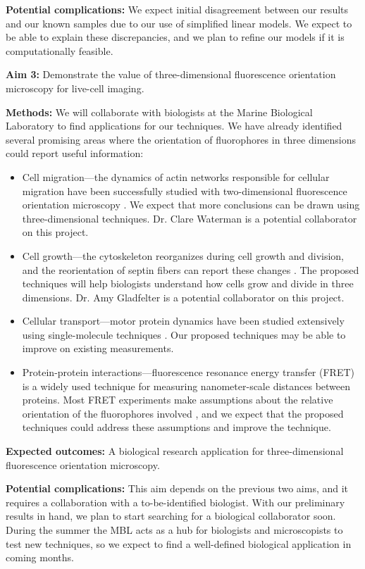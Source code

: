 \documentclass[11pt]{article}
\begin{document}
\noindent\textbf{Potential complications:} We expect initial disagreement
between our results and our known samples due to our use of simplified linear
models. We expect to be able to explain these discrepancies, and we plan to
refine our models if it is computationally feasible.

\noindent\textbf{Aim 3:} Demonstrate the value of three-dimensional fluorescence
  orientation microscopy for live-cell imaging.

\noindent\textbf{Methods:} We will collaborate with biologists at the Marine
Biological Laboratory to find applications for our techniques. We have already
identified several promising areas where the orientation of fluorophores in
three dimensions could report useful information:
\begin{itemize}
\item Cell migration---the dynamics of actin networks responsible for cellular
  migration have been successfully studied with two-dimensional fluorescence
  orientation microscopy \cite{swam}. We expect that more conclusions can be
  drawn using three-dimensional techniques. Dr. Clare Waterman is a potential
  collaborator on this project.
\item Cell growth---the cytoskeleton reorganizes during cell growth and
  division, and the reorientation of septin fibers can report these changes
  \cite{mehta2016}. The proposed techniques will help biologists understand how
  cells grow and divide in three dimensions. Dr. Amy Gladfelter is a potential
  collaborator on this project.
\item Cellular transport---motor protein dynamics have been studied extensively
  using single-molecule techniques \cite{toprak2006}. Our proposed techniques
  may be able to improve on existing measurements.
\item Protein-protein interactions---fluorescence resonance energy transfer
  (FRET) is a widely used technique for measuring nanometer-scale distances
  between proteins. Most FRET experiments make assumptions about the relative
  orientation of the fluorophores involved \cite{nov2006}, and we expect that the
  proposed techniques could address these assumptions and improve the technique.
\end{itemize}

\noindent\textbf{Expected outcomes:} A biological research application for
three-dimensional fluorescence orientation microscopy. 

\noindent\textbf{Potential complications:} This aim depends on the previous two
aims, and it requires a collaboration with a to-be-identified biologist. With
our preliminary results in hand, we plan to start searching for a biological
collaborator soon. During the summer the MBL acts as a hub for biologists and
microscopists to test new techniques, so we expect to find a well-defined
biological application in coming months.
\end{document}
